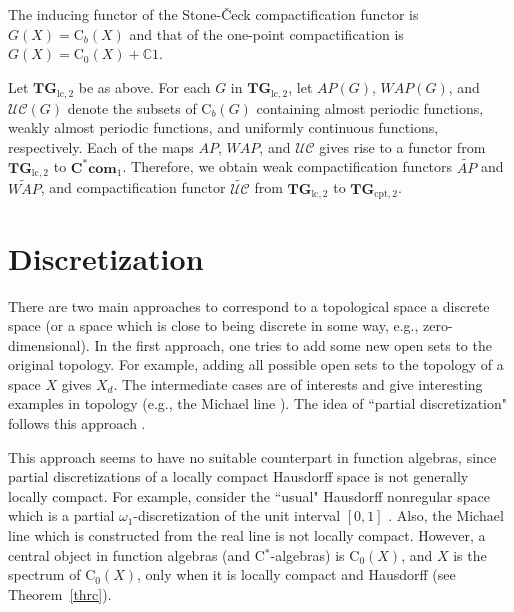 \documentclass[manuscript]{amsart}
\theoremstyle{definition}
\begin{document}
The inducing functor of the Stone-\v{C}eck compactification functor
is $G(X)=\mathrm{C}_{b}(X)$ and
 that of the one-point compactification is $G(X)=\mathrm{C}_{0}(X)+\mathbb{C}1$.

Let $\mathbf{TG}_{\mathrm{lc,2}}$ be as above.
For each  $G$ in $\mathbf{TG}_{\mathrm{lc,2}}$, let $AP(G)$, $WAP(G)$,
 and $\mathcal{UC}(G)$
denote the subsets of $\mathrm{C}_{b}(G)$ containing
almost periodic functions, weakly almost periodic functions, and uniformly continuous functions, respectively.
Each of the maps $AP$, $WAP$,  and
$\mathcal{UC}$ gives rise to a  functor from $\mathbf{TG}_{\mathrm{lc,2}}$
to $\mathbf{C^{*}com}_{1}$. Therefore,  we obtain weak compactification functors
$\widetilde{AP}$ and $\widetilde{WAP}$, and compactification functor
$\widetilde{\mathcal{UC}}$
from $\mathbf{TG}_{\mathrm{lc,2}}$ to
$\mathbf{TG}_{\mathrm{cpt,2}}$.

\section{Discretization}
\noindent
There are two main approaches to correspond  to a topological space a discrete space (or a space
which is close to being discrete in some way, e.g., zero-dimensional).
In the first approach, one tries to add some new open sets to the original topology.
For example, adding all possible open sets to the topology of a space $X$ gives
$X_{d}$. The intermediate cases are of interests and give interesting examples in topology
(e.g., the Michael line \cite[Example~5.1.32]{en89}). The idea of ``partial discretization"
follows this approach \cite{bcm00}.

This approach seems to have no suitable counterpart
in function algebras, since partial discretizations
of a locally compact Hausdorff space is not generally locally compact.
For example, consider the ``usual" Hausdorff nonregular  space \cite[Example~1.5.6]{en89} which is
a partial $\omega_{1}$-discretization of the unit interval $[0,1]$ \cite{bcm00}.
Also, the Michael line which is constructed from the real line is not locally compact.
However, a central object in function algebras
(and C$^*$-algebras) is
 $\mathrm{C}_{0}(X)$, and  $X$ is the spectrum of
$\mathrm{C}_{0}(X)$, only when it is locally compact and Hausdorff (see Theorem~\ref{thrc}).
\end{document}
